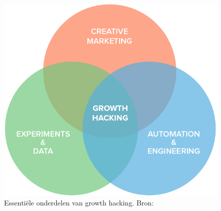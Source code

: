 \begin{figure}[h!]
	\includegraphics[width=\linewidth]{img/growth-hacking-essential-parts.png}
	\centering
	\caption{Essentiële onderdelen van growth hacking. Bron: \autocite{Rosado2018}}
	\label{fig:partsGrowthHacking}
\end{figure}

